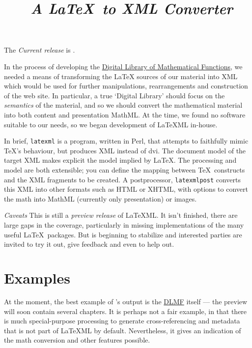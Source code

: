 \documentclass{article}
\title{\LaTeXML\ \emph{A \LaTeX\ to XML Converter}}
\begin{document}
\maketitle

The \emph{Current release} is .

In the process of developing the
\href{http://dlmf.nist.gov/}{Digital Library of Mathematical Functions},
we needed a means of transforming
the LaTeX sources of our material into XML which would be used
for further manipulations, rearrangements and construction of the web site.
In particular, a true `Digital Library' should focus on the \emph{semantics}
of the material, and so we should convert the mathematical material into both
content and presentation MathML.
At the time, we found no software suitable to our needs, so we began
development of LaTeXML in-house.  

In brief, \texttt{latexml} is a program, written in Perl, that attempts to
faithfully mimic \TeX's behaviour, but produces XML instead of dvi.
The document model of the target XML makes explicit the model implied
by \LaTeX.
The processing and model are both extensible; you can define
the mapping between \TeX\ constructs and the XML fragments to be created.
A postprocessor, \texttt{latexmlpost} converts this
XML into other formats such as HTML or XHTML, with options
to convert the math into MathML (currently only presentation) or images.

\emph{Caveats} This is still a \emph{preview release} of LaTeXML.
It isn't finished, there are large gaps in the coverage,
particularly in missing implementations of the many useful \LaTeX\ packages.
But is beginning to stabilize and interested parties
are invited to try it out, give feedback and even to help out.


\section{Examples}\label{examples}
At the moment, the best example of \LaTeXML's output is 
the \href{http://dlmf.nist.gov/}{DLMF} itself
--- the preview  will soon contain several chapters.
It is perhaps not a fair example, in that there is much
special-purpose processing to generate cross-referencing and metadata that is not
part of LaTeXML by default. Nevertheless, it gives an indication of the
math conversion and other features possible.
\end{document}
